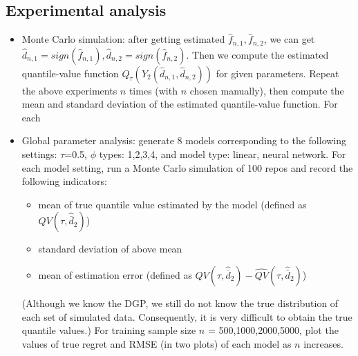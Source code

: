 \documentclass[10pt]{article}
\theoremstyle{remark} \newtheorem{rem}{Remark}
\begin{document}
\subsection{Experimental analysis}
\begin{itemize}
    \item Monte Carlo simulation: 
    after getting estimated $\hat f_{n,1}, \hat f_{n,2}$, we can get $\hat d_{n,1}= sign (\hat f_{n,1}), \hat d_{n,2} = sign(\hat f_{n,2}).$
    Then we compute the estimated quantile-value function $Q_\tau(Y_2(\hat d_{n,1}, \hat d_{n,2}))$ for given parameters. 
    Repeat the above experiments $n$ times (with $n$ chosen manually), then compute the mean and standard deviation of the estimated quantile-value function.
    For each

    \item Global parameter analysis: 
    generate 8 models corresponding to the following settings: $\tau$=0.5, $\phi$ types: 1,2,3,4, and model type: linear, neural network.
    For each model setting, run a Monte Carlo simulation of 100 repos and record the following indicators:
    \begin{itemize}
        \item mean of true quantile value estimated by the model (defined as $QV(\tau,\hat {\bar d}_2)$)
        \item standard deviation of above mean 
        \item mean of estimation error (defined as $QV(\tau,\hat {\bar d}_2) - \hat {QV}(\tau, \hat {\bar d}_2)$)
    \end{itemize}
    (Although we know the DGP, we still do not know the true distribution of each set of simulated data. Consequently, it is very difficult to obtain the true quantile values.)
    For training sample size $n$ = 500,1000,2000,5000, plot the values of true regret and RMSE (in two plots) of each model as $n$ increases.
    

\end{itemize}
\end{document}
